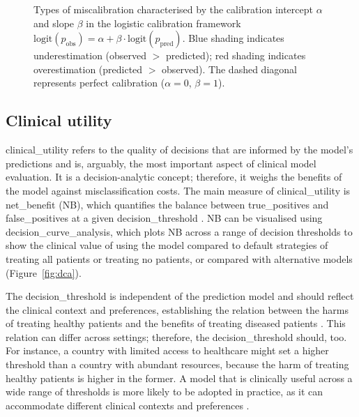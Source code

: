\begin{figure}[htbp]
\caption[Types of miscalibration by calibration intercept and slope]{Types of miscalibration characterised by the calibration intercept $\alpha$ and slope $\beta$ in the logistic calibration framework $\text{logit}(p_{\text{obs}}) = \alpha + \beta \cdot \text{logit}(p_{\text{pred}})$. Blue shading indicates underestimation (observed $>$ predicted); red shading indicates overestimation (predicted $>$ observed). The dashed diagonal represents perfect calibration ($\alpha = 0$, $\beta = 1$).}
\label{fig:miscal:types}
\end{figure}

\subsection{Clinical utility}

\Gls{clinical_utility} refers to the quality of decisions that are informed by the model's predictions and is, arguably, the most important aspect of clinical model evaluation. It is a decision-analytic concept; therefore, it weighs the benefits of the model against misclassification costs. The main measure of \gls{clinical_utility} is \gls{net_benefit} (NB), which quantifies the balance between \glspl{true_positive} and \glspl{false_positive} at a given \gls{decision_threshold} \cite{vickersDecisionCurveAnalysis2006}. \Gls{NB} can be visualised using \gls{decision_curve_analysis}, which plots \gls{NB} across a range of decision thresholds to show the clinical value of using the model compared to default strategies of treating all patients or treating no patients, or compared with alternative models (Figure~\ref{fig:dca}). 

The \gls{decision_threshold} is independent of the prediction model and should reflect the clinical context and preferences, establishing the relation between the harms of treating healthy patients and the benefits of treating diseased patients \cite{onbehalfofthetopicgroupevaluatingdiagnostictestsandpredictionmodelsofthestratosinitiativeThreeMythsRisk2019}. This relation can differ across settings; therefore, the \gls{decision_threshold} should, too. For instance, a country with limited access to healthcare might set a higher threshold than a country with abundant resources, because the harm of treating healthy patients is higher in the former. A model that is clinically useful across a wide range of thresholds is more likely to be adopted in practice, as it can accommodate different clinical contexts and preferences \cite{vancalsterPerformanceEvaluationPredictive2024}.

